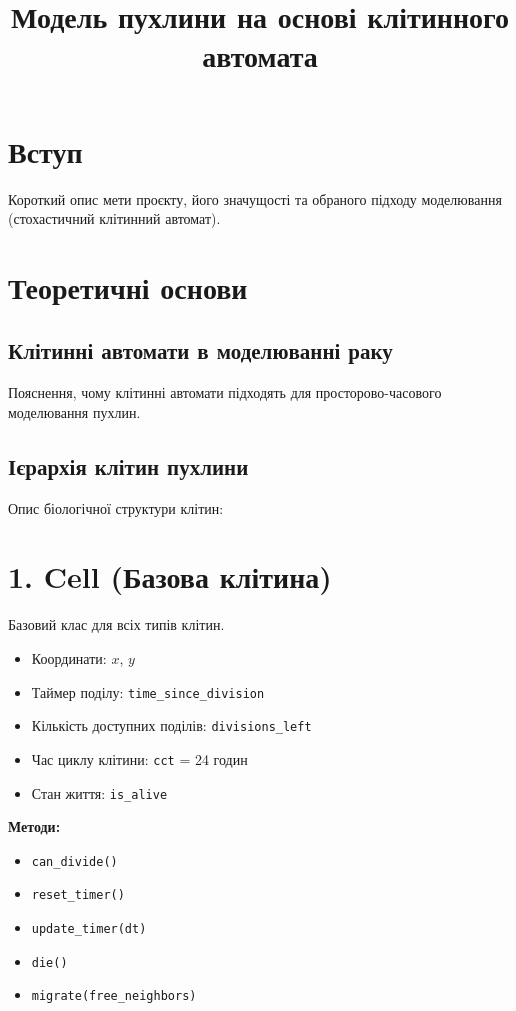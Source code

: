 \documentclass{article}
\title{Модель пухлини на основі клітинного автомата}
\date{}
\begin{document}
\maketitle

\tableofcontents

\newpage

\section{Вступ}
Короткий опис мети проєкту, його значущості та обраного підходу моделювання (стохастичний клітинний автомат).

\section{Теоретичні основи}
\subsection{Клітинні автомати в моделюванні раку}
Пояснення, чому клітинні автомати підходять для просторово-часового моделювання пухлин.

\subsection{Ієрархія клітин пухлини}
Опис біологічної структури клітин:

\maketitle

\section*{1. \textbf{Cell (Базова клітина)}}
Базовий клас для всіх типів клітин.

\begin{itemize}
    \item Координати: $x$, $y$
    \item Таймер поділу: \texttt{time\_since\_division}
    \item Кількість доступних поділів: \texttt{divisions\_left}
    \item Час циклу клітини: \texttt{cct} = 24 годин
    \item Стан життя: \texttt{is\_alive}
\end{itemize}

\noindent \textbf{Методи:}
\begin{itemize}
    \item \texttt{can\_divide()}
    \item \texttt{reset\_timer()}
    \item \texttt{update\_timer(dt)}
    \item \texttt{die()}
    \item \texttt{migrate(free\_neighbors)}
\end{itemize}
\end{document}
